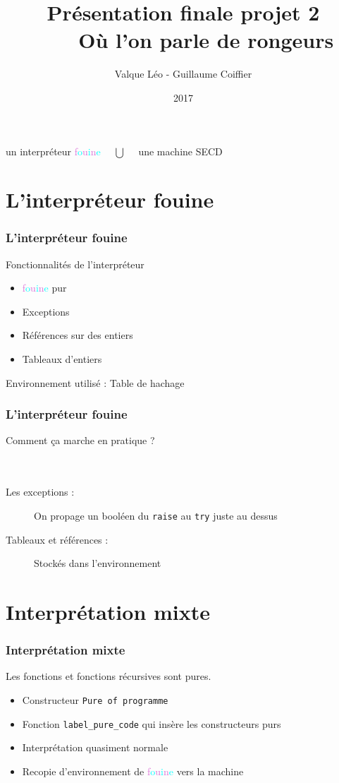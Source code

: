\documentclass[xcolor=dvipsnames]{beamer}
\title{Présentation finale projet 2 \\ ~ ~ Où l'on parle de rongeurs}
\author{Valque Léo - Guillaume Coiffier}
\institute{ENS de Lyon}
\date{2017}
\newcommand{\fouine}{\textsf{\textcolor{Orchid}{f}\textcolor{Cyan}{o}\textcolor{Orchid}{u}\textcolor{Cyan}{i}\textcolor{Orchid}{n}\textcolor{Cyan}{e} }}
\begin{document}
\maketitle

\begin{frame}
 \centering
 \Large un interpréteur \fouine $\quad \bigcup \quad $ une machine SECD
\end{frame}

\section{L'interpréteur fouine}

\begin{frame}
\frametitle{L'interpréteur fouine}
  Fonctionnalités de l'interpréteur
  \begin{itemize}
   \item \fouine pur \pause
   \item Exceptions \pause
   \item Références sur des entiers \pause
   \item Tableaux d'entiers \pause
  \end{itemize}
  Environnement utilisé : Table de hachage
\end{frame}

\begin{frame}
\frametitle{L'interpréteur fouine}
  Comment ça marche en pratique ? \\ ~ \\ \pause
  \begin{description}
   \item[Les exceptions :] On propage un booléen du \texttt{raise} au \texttt{try} juste au dessus \pause
   \item[Tableaux et références :] Stockés dans l'environnement
  \end{description}
\end{frame}

\section{Interprétation mixte}

\begin{frame}
\frametitle{Interprétation mixte}
  Les fonctions et fonctions récursives sont pures. \pause
 \begin{itemize}
   \item Constructeur \texttt{Pure of programme} \pause
   \item Fonction \texttt{label\_pure\_code} qui insère les constructeurs purs \pause
   \item Interprétation quasiment normale \pause
   \item Recopie d'environnement de \fouine vers la machine
  \end{itemize}
\end{frame}
\end{document}
